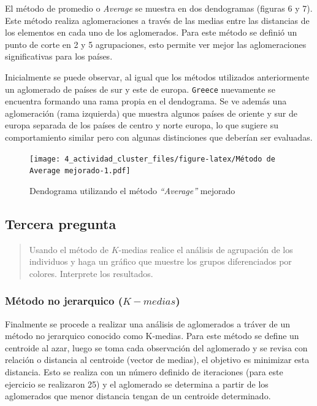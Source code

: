\documentclass[
]{article}
\begin{document}
El método de promedio o \emph{Average} se muestra en dos dendogramas
(figuras 6 y 7). Este método realiza aglomeraciones a través de las
medias entre las distancias de los elementos en cada uno de los
aglomerados. Para este método se definió un punto de corte en 2 y 5
agrupaciones, esto permite ver mejor las aglomeraciones significativas
para los países.

Inicialmente se puede observar, al igual que los métodos utilizados
anteriormente un aglomerado de países de sur y este de europa.
\texttt{Greece} nuevamente se encuentra formando una rama propia en el
dendograma. Se ve además una aglomeración (rama izquierda) que muestra
algunos países de oriente y sur de europa separada de los países de
centro y norte europa, lo que sugiere su comportamiento similar pero con
algunas distinciones que deberían ser evaluadas.

\begin{figure}
\centering
\texttt{[image: 4\_actividad\_cluster\_files/figure-latex/Método de Average mejorado-1.pdf]}
\caption{Dendograma utilizando el método \emph{``Average''} mejorado}
\end{figure}

\hypertarget{tercera-pregunta}{%
\subsection{Tercera pregunta}\label{tercera-pregunta}}

\begin{quote}
Usando el método de \(K\)-medias realice el análisis de agrupación de
los individuos y haga un gráfico que muestre los grupos diferenciados
por colores. Interprete los resultados.
\end{quote}

\hypertarget{muxe9todo-no-jerarquico-k-medias}{%
\subsubsection{\texorpdfstring{Método no jerarquico
(\(K-medias\))}{Método no jerarquico (K-medias)}}\label{muxe9todo-no-jerarquico-k-medias}}

Finalmente se procede a realizar una análisis de aglomerados a tráver de
un método no jerarquico conocido como K-medias. Para este método se
define un centroide al azar, luego se toma cada observación del
aglomerado y se revisa con relación o distancia al centroide (vector de
medias), el objetivo es minimizar esta distancia. Esto se realiza con un
número definido de iteraciones (para este ejercicio se realizaron 25) y
el aglomerado se determina a partir de los aglomerados que menor
distancia tengan de un centroide determinado.
\end{document}
